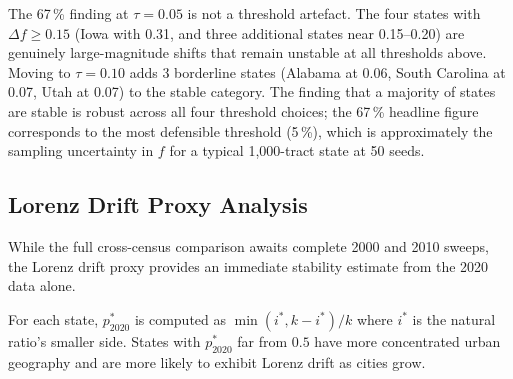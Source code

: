 The 67\,\% finding at $\tau = 0.05$ is not a threshold artefact.
The four states with $\Delta f \geq 0.15$ (Iowa with 0.31,
and three additional states near 0.15--0.20) are genuinely large-magnitude
shifts that remain unstable at all thresholds above.
Moving to $\tau = 0.10$ adds 3 borderline states (Alabama at 0.06,
South Carolina at 0.07, Utah at 0.07) to the stable category.
The finding that a majority of states are stable is robust across all
four threshold choices; the 67\,\% headline figure corresponds to the
most defensible threshold (5\,\%), which is approximately the sampling
uncertainty in $f$ for a typical 1{,}000-tract state at 50 seeds.

\subsection{Lorenz Drift Proxy Analysis}
\label{sec:lorenz-analysis}

While the full cross-census comparison awaits complete 2000 and 2010 sweeps,
the Lorenz drift proxy provides an immediate stability estimate from the 2020
data alone.

For each state, $p^*_{2020}$ is computed as $\min(i^*, k-i^*)/k$ where
$i^*$ is the natural ratio's smaller side.
States with $p^*_{2020}$ far from $0.5$ have more concentrated urban geography
and are more likely to exhibit Lorenz drift as cities grow.


